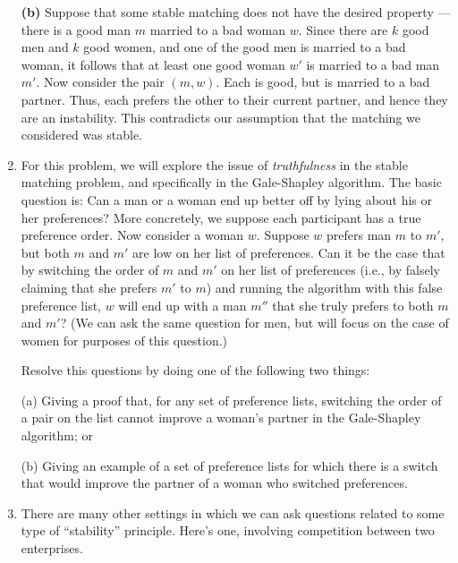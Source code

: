 \documentclass[12pt]{article}
\begin{document}
\begin{enumerate}
{{\bf (b)}
Suppose that some stable matching does not have
the desired property --- there is a good man $m$
married to a bad woman $w$.
Since there are $k$ good men and $k$ good women,
and one of the good men is married to a bad woman,
it follows that at least one good woman $w'$ is
married to a bad man $m'$.
Now consider the pair $(m,w)$.
Each is good, but is married to a bad partner.
Thus, each prefers the other to their current partner,
and hence they are an instability.
This contradicts our assumption that the
matching we considered was stable.

}



\item\Star
For this problem, we will explore the issue of {\em truthfulness} in the
stable matching problem, and specifically in the Gale-Shapley algorithm.
The basic question is: Can a man or a woman end up better off by lying about
his or her preferences?
More concretely, we suppose each participant has a true preference order.
Now consider a woman $w$. Suppose $w$ prefers man $m$ to
$m'$, but both $m$ and $m'$ are low on her list of preferences. Can it be
the case that by switching the order of $m$ and $m'$ on her list of
preferences (i.e., by falsely claiming that she prefers $m'$ to $m$) and
running the algorithm with this false preference list, $w$ will end up with
a man $m''$ that she truly prefers to both $m$ and $m'$?
(We can ask the same question for men, but will focus on the
case of women for purposes of this question.)

Resolve this questions by doing one of the following two things:

(a) Giving a proof that, for any set of preference lists, switching the order
of a pair on the list cannot improve a woman's partner in the
Gale-Shapley algorithm; or

(b) Giving an example of a set of preference lists for which there
is a switch that would improve the partner of a woman who
switched preferences.


\item

There are many other settings
in which we can
ask questions related to some type of ``stability'' principle.
Here's one, involving competition between two enterprises.


\end{enumerate}
\end{document}
